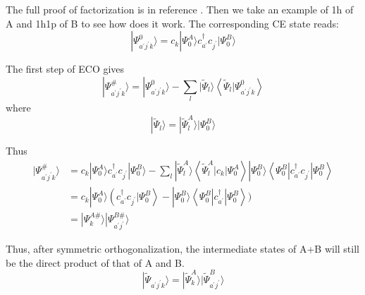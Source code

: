 The full proof of factorization is in reference \cite{sizeproof}.
Then we take an example of 1h of A and 1h1p of B to see how does it work.
The corresponding CE state reads:
\begin{equation}
	| \Psi_{a^{\prime} j^{\prime} k}^{0} \rangle=c_{k} | \Psi_{0}^{A} \rangle c_{a^{\prime}}^{\dagger} c_{j^{\prime}} | \Psi_{0}^{B} \rangle
\end{equation}

The first step of ECO gives
\begin{equation}
	| \Psi_{a^{\prime} j^{\prime} k}^{\#} \rangle=| \Psi_{a^{\prime} j^{\prime} k}^{0} \rangle-\sum_{l} | \tilde{\Psi}_{l} \rangle\left\langle\tilde{\Psi}_{l} | \Psi_{a^{\prime} j^{\prime} k}^{0}\right\rangle
\end{equation}
where
\begin{equation}
	| \tilde{\Psi}_{l} \rangle=| \tilde{\Psi}_{l}^{A} \rangle | \Psi_{0}^{B} \rangle
\end{equation}

Thus
\begin{equation}
	\begin{aligned} 
		| \Psi_{a^{\prime} j^{\prime} k}^{\#} \rangle 
		&=c_{k} | \Psi_{0}^{A} \rangle c_{a^{\prime}}^{\dagger} c_{j^{\prime}} | \Psi_{0}^{B} \rangle-\sum_{l} | \tilde{\Psi}_{l}^{A} \rangle\left\langle\tilde{\Psi}_{l}^{A}\left|c_{k}\right| \Psi_{0}^{A}\right\rangle | \Psi_{0}^{B} \rangle\left\langle\Psi_{0}^{B}\left|c_{a^{\prime}}^{\dagger} c_{j^{\prime}}\right| \Psi_{0}^{B}\right\rangle 
		\\ 
		&= c_{k} | \Psi_{0}^{A} \rangle\left(c_{a^{\prime}}^{\dagger} c_{j^{\prime}} | \Psi_{0}^{B}\right\rangle-| \Psi_{0}^{B} \rangle\left\langle\Psi_{0}^{B}\left|c_{a^{\prime}}^{\dagger}\right| \Psi_{0}^{B}\right\rangle )
		\\
		&=| \Psi_{k}^{A \#} \rangle | \Psi_{a^{\prime} j^{\prime}}^{B \#} \rangle
	\end{aligned}
\end{equation}

Thus, after symmetric orthogonalization, the intermediate states of A+B will still be the direct product of that of A and B.
\begin{equation}
	| \tilde{\Psi}_{a^{\prime} j^{\prime} k} \rangle=| \tilde{\Psi}_{k}^{A} \rangle | \tilde{\Psi}_{a^{\prime} j^{\prime}}^{B} \rangle
\end{equation}


